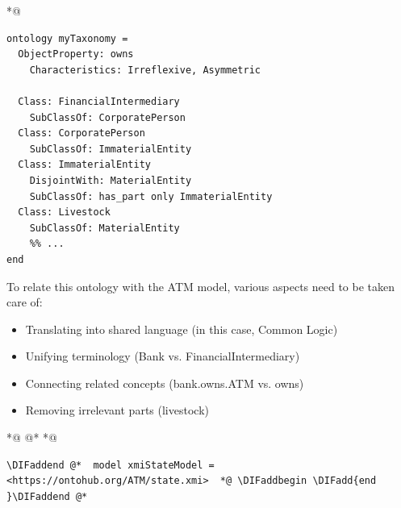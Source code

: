 \documentclass[10pt,fleqn,final]{scrreprt}
\newenvironment{definitions}[0]{\medskip }{}
\providecommand{\DIFadd}[1]{{\protect\color{blue}\uwave{#1}}} %
\providecommand{\DIFaddbegin}{} %
\providecommand{\DIFaddend}{} %
\providecommand{\DIFdelbegin}{} %
\providecommand{\DIFdelend}{} %
\begin{document}
\begin{definitions}
 *@ \DIFdelbegin %
\begin{lstlisting}[basicstyle=\ttfamily,language=dolText,alsolanguage=owl2Manchester,escapechar=@,mathescape]
ontology myTaxonomy =
  ObjectProperty: owns
    Characteristics: Irreflexive, Asymmetric

  Class: FinancialIntermediary
    SubClassOf: CorporatePerson
  Class: CorporatePerson
    SubClassOf: ImmaterialEntity
  Class: ImmaterialEntity
    DisjointWith: MaterialEntity
    SubClassOf: has_part only ImmaterialEntity
  Class: Livestock
    SubClassOf: MaterialEntity
    %% ...
end
\end{lstlisting}

 To relate this ontology with the ATM model, 
various aspects need to be taken care of:
\begin{itemize}
  \item Translating into shared language  (in this case, Common Logic)
  \item Unifying terminology (Bank vs. FinancialIntermediary)
  \item Connecting related concepts (bank.owns.ATM vs. owns)
  \item Removing irrelevant parts (livestock) 
\end{itemize}

 *@ \DIFdelbegin %
\DIFdelend @*   *@ \DIFaddbegin \begin{lstlisting}[basicstyle=\ttfamily\small,language=dolText,alsolanguage=owl2Manchester,escapechar=@,mathescape]
\DIFaddend @*  model xmiStateModel = <https://ontohub.org/ATM/state.xmi>  *@ \DIFaddbegin \DIFadd{end
}\DIFaddend @*  


\end{lstlisting}
\end{definitions}
\end{document}
